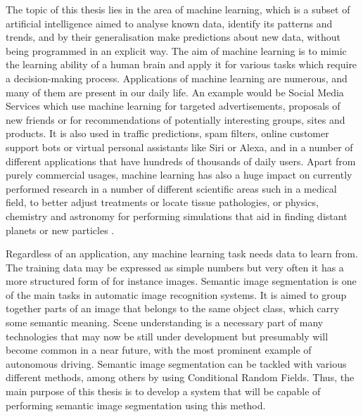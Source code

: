 The topic of this thesis lies in the area of machine learning, which is a subset of artificial intelligence aimed to analyse known data, identify its patterns and trends, and by their generalisation make predictions about new data, without being programmed in an explicit way. The aim of machine learning is to mimic the learning ability of a human brain and apply it for various tasks which require a decision-making process. Applications of machine learning are numerous, and many of them are present in our daily life. An example would be Social Media Services which use machine learning for targeted advertisements, proposals of new friends or for recommendations of potentially interesting groups, sites and products. It is also used in traffic predictions, spam filters, online customer support bots or virtual personal assistants like Siri or Alexa, and in a number of different applications that have hundreds of thousands of daily users. Apart from purely commercial usages, machine learning has also a huge impact on currently performed research in a number of different scientific areas such in a medical field, to better adjust treatments or locate tissue pathologies, or physics, chemistry and astronomy for performing simulations that aid in finding distant planets or new particles \cite{ml_uses}. 

Regardless of an application, any machine learning task needs data to learn from. The training data may be expressed as simple numbers but very often it has a more structured form of for instance images. Semantic image segmentation is one of the main tasks in automatic image recognition systems. It is aimed to group together parts of an image that belongs to the same object class, which carry some semantic meaning. Scene understanding is a necessary part of many technologies that may now be still under development but presumably will become common in a near future, with the most prominent example of autonomous driving. Semantic image segmentation can be tackled with various different methods, among others by using Conditional Random Fields. Thus, the main purpose of this thesis is to develop a system that will be capable of performing semantic image segmentation using this method.
